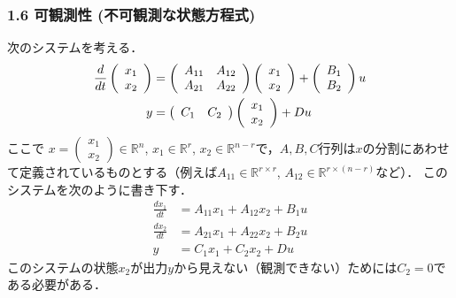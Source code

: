 \begin{frame}[t]
\frametitle{1.6 可観測性 (不可観測な状態方程式)}
次のシステムを考える．
\begin{align}
 \frac{d}{dt}
  \left(\begin{array}{c}
         {x}_1 \\
   {x}_2
  \end{array}\right)
  &=
  \left(\begin{array}{cc}
         {A}_{11} & {A}_{12} \\
       {A}_{21} & {A}_{22}
  \end{array}\right)
  \left(\begin{array}{c}
         {x}_1 \\
   {x}_2
  \end{array}\right)
  +
  \left(\begin{array}{c}
         {B}_1 \\
   {B}_2
  \end{array}\right)
  u \\
 y &=
  \left(\begin{array}{cc}
         {C}_1 & C_2
  \end{array}\right)
  \left(\begin{array}{c}
         {x}_1 \\
   {x}_2
  \end{array}\right)
  + D u
\vspace{-5mm}
\end{align}
ここで
$x = \left(\begin{array}{c} {x}_1 \\ {x}_2 \end{array}\right) \in {\mathbb R}^n$,
$x_1 \in {\mathbb R}^r$, $x_2 \in {\mathbb R}^{n-r}$で，$A,B,C$行列は$x$の分割にあわせて定義されているものとする（例えば$A_{11} \in {\mathbb R}^{r \times r}$, $A_{12} \in {\mathbb R}^{r \times (n-r)}$など）．
このシステムを次のように書き下す．
\begin{align}
 \frac{dx_1}{dt} &= A_{11} x_1 + A_{12} x_2 + B_1 u
\label{eq:observable1} \\
 \frac{dx_2}{dt} &= A_{21} x_1 + A_{22} x_2 + B_2 u
\label{eq:observable2} \\
 y & = C_1 x_1 + C_2 x_2+ Du
\label{eq:observable03}
\end{align}
このシステムの状態$x_2$が出力$y$から見えない（観測できない）ためには$C_2=0$である必要がある．
\end{frame}


